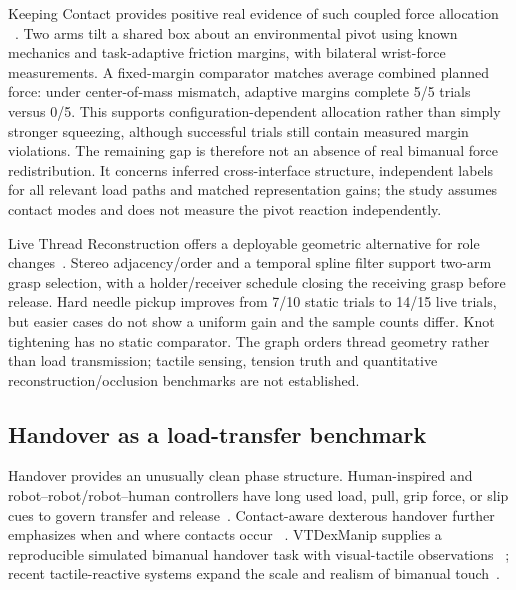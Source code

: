 Keeping Contact provides positive real evidence of such coupled force allocation
~\cite{update2026keepingcontact}. Two arms tilt a shared box about an environmental
pivot using known mechanics and task-adaptive friction margins, with bilateral
wrist-force measurements. A fixed-margin comparator matches average combined
planned force: under center-of-mass mismatch, adaptive margins complete 5/5
trials versus 0/5. This supports configuration-dependent allocation rather than
simply stronger squeezing, although successful trials still contain measured
margin violations. The remaining gap is therefore not an absence of real
bimanual force redistribution. It concerns inferred cross-interface structure,
independent labels for all relevant load paths and matched representation gains;
the study assumes contact modes and does not measure the pivot reaction
independently.

Live Thread Reconstruction offers a deployable geometric alternative for role
changes~\cite{update2026livethread}. Stereo adjacency/order and a temporal spline
filter support two-arm grasp selection, with a holder/receiver schedule closing
the receiving grasp before release. Hard needle pickup improves from 7/10 static
trials to 14/15 live trials, but easier cases do not show a uniform gain and the
sample counts differ. Knot tightening has no static comparator. The graph orders
thread geometry rather than load transmission; tactile sensing, tension truth
and quantitative reconstruction/occlusion benchmarks are not established.

\subsection{Handover as a load-transfer benchmark}

Handover provides an unusually clean phase structure. Human-inspired and
robot--robot/robot--human controllers have long used load, pull, grip force, or
slip cues to govern transfer and release~\cite{costanzo2021handover}. Contact-aware
dexterous handover further emphasizes when and where contacts occur
~\cite{wang2024contacthandover}. VTDexManip supplies a reproducible simulated
bimanual handover task with visual-tactile observations
~\cite{liu2025vtdexmanip}; recent tactile-reactive systems expand the scale and
realism of bimanual touch~\cite{niu2026trex}.

